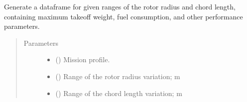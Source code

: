 \documentclass[letterpaper,10pt,english]{sphinxmanual}
\begin{document}
\begin{fulllineitems}
\begin{fulllineitems}
\label{\detokenize{modules/helicopter:helicopter.Helicopter.preliminary_design}}
\sphinxAtStartPar
Generate a dataframe for given ranges of the rotor radius and chord
length, containing maximum take\sphinxhyphen{}off weight, fuel consumption, and
other performance parameters.
\begin{quote}\begin{description}
\item[{Parameters}] \leavevmode\begin{itemize}
\item {} 
\sphinxAtStartPar
{} ({\hyperref[\detokenize{modules/mission:mission.Mission}]{}}) \textendash{} Mission profile.

\item {} 
\sphinxAtStartPar
{} (\sphinxstyleliteralemphasis{\sphinxupquote{(}}\sphinxstyleliteralemphasis{\sphinxupquote{, }}\sphinxstyleliteralemphasis{\sphinxupquote{, }}\sphinxstyleliteralemphasis{\sphinxupquote{)}}) \textendash{} Range of the rotor radius variation; m

\item {} 
\sphinxAtStartPar
{} (\sphinxstyleliteralemphasis{\sphinxupquote{(}}\sphinxstyleliteralemphasis{\sphinxupquote{, }}\sphinxstyleliteralemphasis{\sphinxupquote{, }}\sphinxstyleliteralemphasis{\sphinxupquote{)}}) \textendash{} Range of the chord length variation; m


\end{itemize}
\end{description}
\end{quote}
\end{fulllineitems}
\end{fulllineitems}
\end{document}
